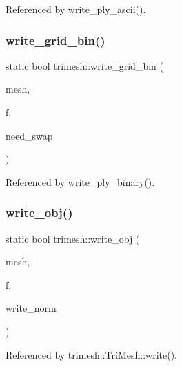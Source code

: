 Referenced by write\+\_\+ply\+\_\+ascii().

\mbox{\label{namespacetrimesh_a35807463091f1c41203f2e4580460ce4}} 
\subsubsection{\texorpdfstring{write\+\_\+grid\+\_\+bin()}{write\_grid\_bin()}}
{\footnotesize\ttfamily static bool trimesh\+::write\+\_\+grid\+\_\+bin (\begin{DoxyParamCaption}\item[{\hyperlink{classtrimesh_1_1TriMesh}{Tri\+Mesh} $\ast$}]{mesh,  }\item[{F\+I\+LE $\ast$}]{f,  }\item[{bool}]{need\+\_\+swap }\end{DoxyParamCaption})\hspace{0.3cm}{\ttfamily [static]}}



Referenced by write\+\_\+ply\+\_\+binary().

\mbox{\label{namespacetrimesh_a1fd27491a7f94169a1bf5da168bf0a4e}} 
\subsubsection{\texorpdfstring{write\+\_\+obj()}{write\_obj()}}
{\footnotesize\ttfamily static bool trimesh\+::write\+\_\+obj (\begin{DoxyParamCaption}\item[{\hyperlink{classtrimesh_1_1TriMesh}{Tri\+Mesh} $\ast$}]{mesh,  }\item[{F\+I\+LE $\ast$}]{f,  }\item[{bool}]{write\+\_\+norm }\end{DoxyParamCaption})\hspace{0.3cm}{\ttfamily [static]}}



Referenced by trimesh\+::\+Tri\+Mesh\+::write().

\mbox{\label{namespacetrimesh_a8913ffcec7ca6172c82f3b93a1c89318}} 
